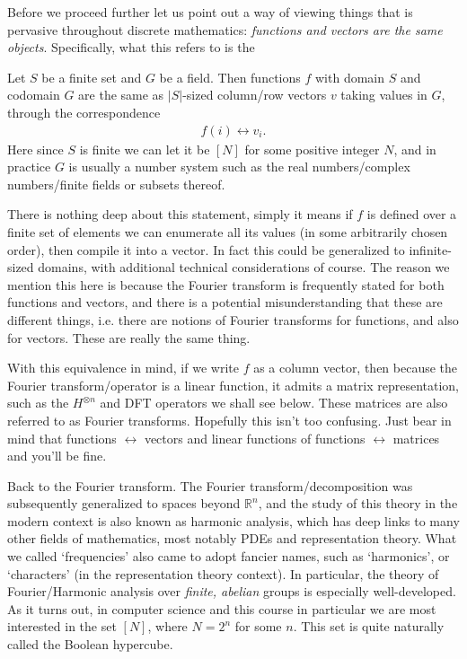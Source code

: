 Before we proceed further let us point out a way of viewing things that is pervasive throughout discrete mathematics: \textit{functions and vectors are the same objects}. Specifically, what this refers to is the
\begin{fact}\label{remark:function-vector_equivalence}
    Let $S$ be a finite set and $G$ be a field. Then functions $f$ with domain $S$ and codomain $G$ are the same as $|S|$-sized column/row vectors $v$ taking values in $G$, through the correspondence
    \begin{align*}
        f(i) \leftrightarrow v_i.
    \end{align*}
    Here since $S$ is finite we can let it be $[N]$ for some positive integer $N$, and in practice $G$ is usually a number system such as the real numbers/complex numbers/finite fields or subsets thereof.
    
    There is nothing deep about this statement, simply it means if $f$ is defined over a finite set of elements we can enumerate all its values (in some arbitrarily chosen order), then compile it into a vector. In fact this could be generalized to infinite-sized domains, with additional technical considerations of course. The reason we mention this here is because the Fourier transform is frequently stated for both functions and vectors, and there is a potential misunderstanding that these are different things, i.e. there are notions of Fourier transforms for functions, and also for vectors. These are really the same thing.

    With this equivalence in mind, if we write $f$ as a column vector, then because the Fourier transform/operator is a linear function, it admits a matrix representation, such as the $H^{\otimes n}$ and DFT operators we shall see below. These matrices are also referred to as Fourier transforms. Hopefully this isn't too confusing. Just bear in mind that functions $\leftrightarrow$ vectors and linear functions of functions $\leftrightarrow$ matrices and you'll be fine.
\end{fact}

Back to the Fourier transform. The Fourier transform/decomposition was subsequently generalized to spaces beyond $\mathbb{R}^n$, and the study of this theory in the modern context is also known as harmonic analysis, which has deep links to many other fields of mathematics, most notably PDEs and representation theory. What we called `frequencies' also came to adopt fancier names, such as `harmonics', or `characters' (in the representation theory context). In particular, the theory of Fourier/Harmonic analysis over \textit{finite, abelian} groups is especially well-developed. As it turns out, in computer science and this course in particular we are most interested in the set $[N]$, where $N=2^n$ for some $n$. This set is quite naturally called the Boolean hypercube.

